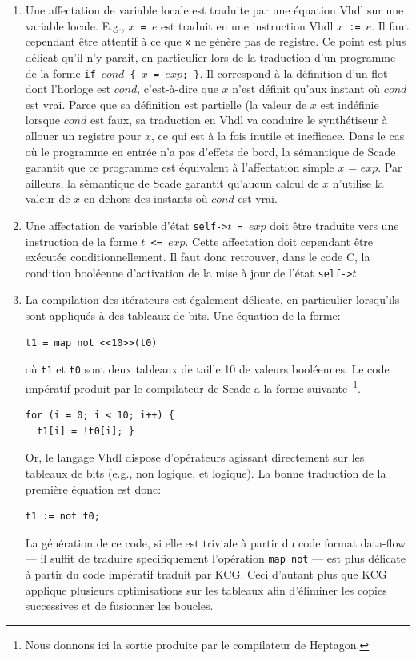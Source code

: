 \documentclass[a4paper]{article}
\newcommand{\scade}{{\sc Scade}}
\newcommand{\heptagon}{{\sc Heptagon}}
\newcommand{\vhdl}{{\sc Vhdl}}
\begin{document}
\begin{enumerate}
\item Une affectation de variable locale est traduite par une \'equation
  \vhdl{} sur une variable locale. E.g., \texttt{$x$ = $e$} est
  traduit en une instruction \vhdl{} \texttt{$x$ := $e$}.  Il faut
  cependant \^etre attentif \`a ce que \verb-x- ne g\'en\`ere pas de registre.
  Ce point est plus d\'elicat qu'il n'y parait, en particulier lors de
  la traduction d'un programme de la forme \texttt{if $cond$ \{ $x$ =
    $exp$; \}}. Il correspond \`a la d\'efinition d'un flot dont l'horloge
  est $cond$, c'est-\`a-dire que $x$ n'est d\'efinit qu'aux instant o\`u
  $cond$ est vrai. Parce que sa d\'efinition est partielle (la valeur de
  $x$ est ind\'efinie lorsque $cond$ est faux, sa traduction en \vhdl{}
  va conduire le synth\'etiseur \`a allouer un registre pour $x$, ce qui
  est \`a la fois inutile et inefficace.  Dans le cas o\`u le programme en
  entr\'ee n'a pas d'effets de bord, la s\'emantique de \scade{} garantit
  que ce programme est \'equivalent \`a l'affectation simple $x$ = $exp$. Par
  ailleurs, la s\'emantique de \scade{} garantit qu'aucun calcul de $x$ n'utilise
  la valeur de $x$ en dehors des instants o\`u $cond$ est vrai.
\item Une affectation de variable d'\'etat \texttt{self->$t$ =
    $exp$} doit \^etre traduite vers une instruction de la forme
  \texttt{$t$ <= $exp$}. Cette affectation doit cependant \^etre ex\'ecut\'ee
  conditionnellement. Il faut donc retrouver, dans le code C,
  la condition bool\'eenne d'activation de la mise \`a jour de
  l'\'etat \texttt{self->$t$}.
\item La compilation des it\'erateurs est \'egalement d\'elicate, en
  particulier lorsqu'ils sont appliqu\'es \`a des tableaux de bits. Une
  \'equation de la forme:
\begin{verbatim}
t1 = map not <<10>>(t0)
\end{verbatim}
o\`u \verb-t1- et \verb-t0- sont deux tableaux de taille 10 de valeurs
bool\'eennes. Le code imp\'eratif produit par le compilateur de \scade{} a
la forme suivante~\footnote{Nous donnons ici la sortie produite par le
  compilateur de \heptagon.}.
\begin{verbatim}
for (i = 0; i < 10; i++) {
  t1[i] = !t0[i]; }
\end{verbatim}
Or, le langage \vhdl{} dispose d'op\'erateurs agissant directement sur les
tableaux de bits (e.g., non logique, et logique). La bonne traduction
de la premi\`ere \'equation est donc:
\begin{verbatim}
t1 := not t0;
\end{verbatim}
La g\'en\'eration de ce code, si elle est triviale \`a partir du code format
data-flow --- il suffit de traduire specifiquement l'op\'eration
\verb-map not- --- est plus d\'elicate \`a partir du code imp\'eratif
traduit par KCG. Ceci d'autant plus que KCG applique plusieurs optimisations
sur les tableaux afin d'\'eliminer les copies successives et de fusionner
les boucles.
\end{enumerate}
\end{document}
